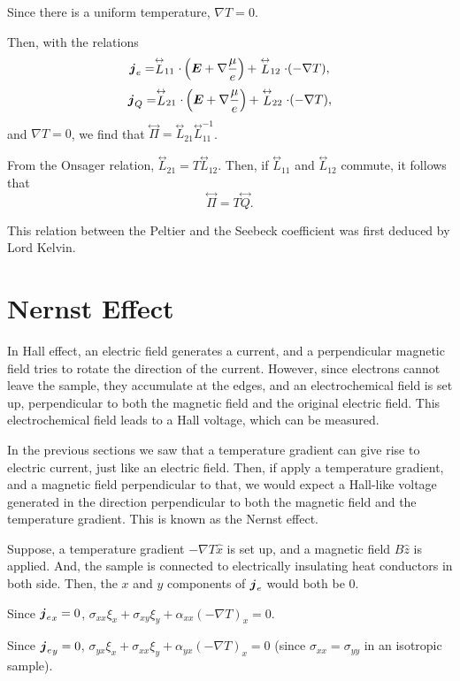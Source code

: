 \documentclass{report}
\renewcommand\vec[1]{\ensuremath\boldsymbol{#1}} %
\begin{document}
Since there is a uniform temperature, $\nabla T = 0$.

Then, with the relations $$\vec{j}_e = \stackrel{\leftrightarrow}{L}_{11} \cdot \left(\vec{E} + \nabla \frac{\mu}{e}\right) + \stackrel{\leftrightarrow}{L}_{12} \cdot (-\nabla{T}),$$  
$$\vec{j}_Q = \stackrel{\leftrightarrow}{L}_{21} \cdot \left(\vec{E} + \nabla \frac{\mu}{e}\right)  + \stackrel{\leftrightarrow}{L}_{22} \cdot (-\nabla{T}),$$ and $\nabla T = 0$, we find that $\stackrel{\leftrightarrow}{\Pi} =  \stackrel{\leftrightarrow}{L}_{21} {\stackrel{\leftrightarrow}{L}}^{-1}_{11}$.

From the Onsager relation, $\stackrel{\leftrightarrow}{L}_{21} = T \stackrel{\leftrightarrow}{L}_{12}$. Then, if $\stackrel{\leftrightarrow}{L}_{11}$ and $\stackrel{\leftrightarrow}{L}_{12}$ commute, it follows that $$\boxed{\stackrel{\leftrightarrow}{\Pi} =  T \stackrel{\leftrightarrow}{Q}}.$$

This relation between the Peltier and the Seebeck coefficient was first deduced by Lord Kelvin.
\section{Nernst Effect}
In Hall effect, an electric field generates a current, and a perpendicular magnetic field tries to rotate the direction of the current. However, since electrons cannot leave the sample, they accumulate at the edges, and an electrochemical field is set up, perpendicular to both the magnetic field and the original electric field. This electrochemical field leads to a Hall voltage, which can be measured.

In the previous sections we saw that a temperature gradient can give rise to electric current, just like an electric field. Then, if apply a temperature gradient, and a magnetic field perpendicular to that, we would expect a Hall-like voltage generated in the direction perpendicular to both the magnetic field and the temperature gradient. This is known as the Nernst effect.

Suppose, a temperature gradient $-\nabla T \hat{x}$ is set up, and a magnetic field $B \hat{z}$ is applied. And, the sample is connected to electrically insulating heat conductors in both side. Then, the $x$ and $y$ components of $\vec{j}_e$ would both be $0$.

Since ${\vec{j}_e}_x = 0$, $\sigma_{xx} \xi_x + \sigma_{xy} \xi_y + \alpha_{xx} (-\nabla T)_x = 0$. 

Since ${\vec{j}_e}_y = 0$, $\sigma_{yx} \xi_x + \sigma_{xx} \xi_y + \alpha_{y x} (-\nabla T)_x = 0$ (since $\sigma_{xx} = \sigma_{yy}$ in an isotropic sample).
\end{document}

